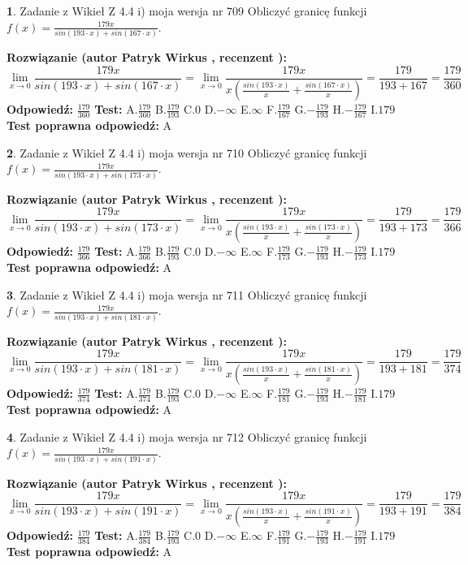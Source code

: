 \documentclass[12pt, a4paper]{article}
\theoremstyle{definition} %
\newtheorem{zad}{}
\newcommand{\zadStart}[1]{\begin{zad}#1\newline}
\newcommand{\zadStop}{\end{zad}}
\newcommand{\rozwStart}[2]{\noindent \textbf{Rozwiązanie (autor #1 , recenzent #2): }\newline}
\newcommand{\rozwStop}{\newline}
\newcommand{\odpStart}{\noindent \textbf{Odpowiedź:}\newline}
\newcommand{\odpStop}{\newline}
\newcommand{\testStart}{\noindent \textbf{Test:}\newline}
\newcommand{\testStop}{\newline}
\newcommand{\kluczStart}{\noindent \textbf{Test poprawna odpowiedź:}\newline}
\newcommand{\kluczStop}{\newline}
\begin{document}
\zadStart{Zadanie z Wikieł Z 4.4 i) moja wersja nr 709}
Obliczyć granicę funkcji $f(x)=\frac{179x}{sin(193\cdot x) +sin(167\cdot x)}$.
\zadStop
\rozwStart{Patryk Wirkus}{}
$$\lim\limits_{x\to 0}\frac{179x}{sin(193\cdot x) +sin(167\cdot x)}=\lim\limits_{x\to 0}\frac{179x}{x(\frac{sin(193\cdot x)}{x}+\frac{sin(167\cdot x)}{x})}=\frac{179}{193+167} = \frac{179}{360}$$
\rozwStop
\odpStart
$\frac{179}{360}$
\odpStop
\testStart
A.$\frac{179}{360}$
B.$\frac{179}{193}$
C.$0$
D.$-\infty$
E.$\infty$
F.$\frac{179}{167}$
G.$-\frac{179}{193}$
H.$-\frac{179}{167}$
I.$179$
\testStop
\kluczStart
A
\kluczStop



\zadStart{Zadanie z Wikieł Z 4.4 i) moja wersja nr 710}
Obliczyć granicę funkcji $f(x)=\frac{179x}{sin(193\cdot x) +sin(173\cdot x)}$.
\zadStop
\rozwStart{Patryk Wirkus}{}
$$\lim\limits_{x\to 0}\frac{179x}{sin(193\cdot x) +sin(173\cdot x)}=\lim\limits_{x\to 0}\frac{179x}{x(\frac{sin(193\cdot x)}{x}+\frac{sin(173\cdot x)}{x})}=\frac{179}{193+173} = \frac{179}{366}$$
\rozwStop
\odpStart
$\frac{179}{366}$
\odpStop
\testStart
A.$\frac{179}{366}$
B.$\frac{179}{193}$
C.$0$
D.$-\infty$
E.$\infty$
F.$\frac{179}{173}$
G.$-\frac{179}{193}$
H.$-\frac{179}{173}$
I.$179$
\testStop
\kluczStart
A
\kluczStop



\zadStart{Zadanie z Wikieł Z 4.4 i) moja wersja nr 711}
Obliczyć granicę funkcji $f(x)=\frac{179x}{sin(193\cdot x) +sin(181\cdot x)}$.
\zadStop
\rozwStart{Patryk Wirkus}{}
$$\lim\limits_{x\to 0}\frac{179x}{sin(193\cdot x) +sin(181\cdot x)}=\lim\limits_{x\to 0}\frac{179x}{x(\frac{sin(193\cdot x)}{x}+\frac{sin(181\cdot x)}{x})}=\frac{179}{193+181} = \frac{179}{374}$$
\rozwStop
\odpStart
$\frac{179}{374}$
\odpStop
\testStart
A.$\frac{179}{374}$
B.$\frac{179}{193}$
C.$0$
D.$-\infty$
E.$\infty$
F.$\frac{179}{181}$
G.$-\frac{179}{193}$
H.$-\frac{179}{181}$
I.$179$
\testStop
\kluczStart
A
\kluczStop



\zadStart{Zadanie z Wikieł Z 4.4 i) moja wersja nr 712}
Obliczyć granicę funkcji $f(x)=\frac{179x}{sin(193\cdot x) +sin(191\cdot x)}$.
\zadStop
\rozwStart{Patryk Wirkus}{}
$$\lim\limits_{x\to 0}\frac{179x}{sin(193\cdot x) +sin(191\cdot x)}=\lim\limits_{x\to 0}\frac{179x}{x(\frac{sin(193\cdot x)}{x}+\frac{sin(191\cdot x)}{x})}=\frac{179}{193+191} = \frac{179}{384}$$
\rozwStop
\odpStart
$\frac{179}{384}$
\odpStop
\testStart
A.$\frac{179}{384}$
B.$\frac{179}{193}$
C.$0$
D.$-\infty$
E.$\infty$
F.$\frac{179}{191}$
G.$-\frac{179}{193}$
H.$-\frac{179}{191}$
I.$179$
\testStop
\kluczStart
A
\kluczStop
\end{document}

